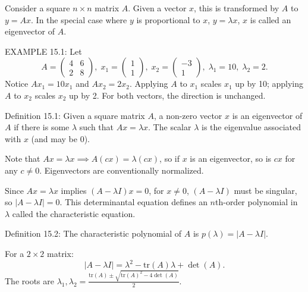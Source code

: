 \begin{original}
Consider a square $n \times n$ matrix $A$. Given a vector $x$, this is transformed by $A$ to $y = Ax$. In the special case where $y$ is proportional to $x$, $y = \lambda x$, $x$ is called an eigenvector of $A$.

EXAMPLE 15.1: Let
\[
A = \begin{pmatrix} 4 & 6 \\ 2 & 8 \end{pmatrix},\; x_1 = \begin{pmatrix} 1 \\ 1 \end{pmatrix},\; x_2 = \begin{pmatrix} -3 \\ 1 \end{pmatrix},\; \lambda_1 = 10,\; \lambda_2 = 2.
\]
Notice $Ax_1 = 10x_1$ and $Ax_2 = 2x_2$. Applying $A$ to $x_1$ scales $x_1$ up by 10; applying $A$ to $x_2$ scales $x_2$ up by 2. For both vectors, the direction is unchanged.

Definition 15.1: Given a square matrix $A$, a non-zero vector $x$ is an eigenvector of $A$ if there is some $\lambda$ such that $Ax = \lambda x$. The scalar $\lambda$ is the eigenvalue associated with $x$ (and may be 0).

Note that $Ax = \lambda x \implies A(cx) = \lambda(cx)$, so if $x$ is an eigenvector, so is $cx$ for any $c \neq 0$. Eigenvectors are conventionally normalized.

Since $Ax = \lambda x$ implies $(A - \lambda I)x = 0$, for $x \neq 0$, $(A - \lambda I)$ must be singular, so $|A - \lambda I| = 0$. This determinantal equation defines an $n$th-order polynomial in $\lambda$ called the characteristic equation.

Definition 15.2: The characteristic polynomial of $A$ is $p(\lambda) = |A - \lambda I|$.

For a $2 \times 2$ matrix:
\[
|A - \lambda I| = \lambda^2 - \text{tr}(A)\lambda + \det(A). \tag{15.1}
\]
The roots are $\lambda_1, \lambda_2 = \frac{\text{tr}(A) \pm \sqrt{\text{tr}(A)^2 - 4\det(A)}}{2}$.
\end{original}
